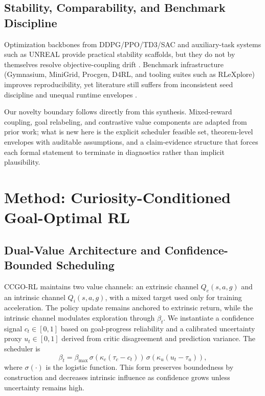 \documentclass{article} %
\begin{document}
\subsection{Stability, Comparability, and Benchmark Discipline}

Optimization backbones from DDPG/PPO/TD3/SAC and auxiliary-task systems such as UNREAL provide practical stability scaffolds, but they do not by themselves resolve objective-coupling drift \citep{arxiv1509_02971, arxiv1511_05952, arxiv1707_06347, arxiv1802_09477, arxiv1801_01290, arxiv1611_05397}. Benchmark infrastructure (Gymnasium, MiniGrid, Procgen, D4RL, and tooling suites such as RLeXplore) improves reproducibility, yet literature still suffers from inconsistent seed discipline and unequal runtime envelopes \citep{ref_gymnasium_2023, ref_minigrid_2023, arxiv1912_01588, arxiv2004_07219, arxiv2006_12983, arxiv2405_19548}.

Our novelty boundary follows directly from this synthesis. Mixed-reward coupling, goal relabeling, and contrastive value components are adapted from prior work; what is new here is the explicit scheduler feasible set, theorem-level envelopes with auditable assumptions, and a claim-evidence structure that forces each formal statement to terminate in diagnostics rather than implicit plausibility.

\section{Method: Curiosity-Conditioned Goal-Optimal RL}
\label{sec:method}

\subsection{Dual-Value Architecture and Confidence-Bounded Scheduling}

CCGO-RL maintains two value channels: an extrinsic channel $Q_e(s,a,g)$ and an intrinsic channel $Q_i(s,a,g)$, with a mixed target used only for training acceleration. The policy update remains anchored to extrinsic return, while the intrinsic channel modulates exploration through $\beta_t$. We instantiate a confidence signal $c_t\in[0,1]$ based on goal-progress reliability and a calibrated uncertainty proxy $u_t\in[0,1]$ derived from critic disagreement and prediction variance. The scheduler is
\begin{equation}
\label{eq:beta_scheduler}
\beta_t = \beta_{\max}\,\sigma\!\left(\kappa_c(\tau_c-c_t)\right)\,\sigma\!\left(\kappa_u(u_t-\tau_u)\right),
\end{equation}
where $\sigma(\cdot)$ is the logistic function. This form preserves boundedness by construction and decreases intrinsic influence as confidence grows unless uncertainty remains high.
\end{document}
